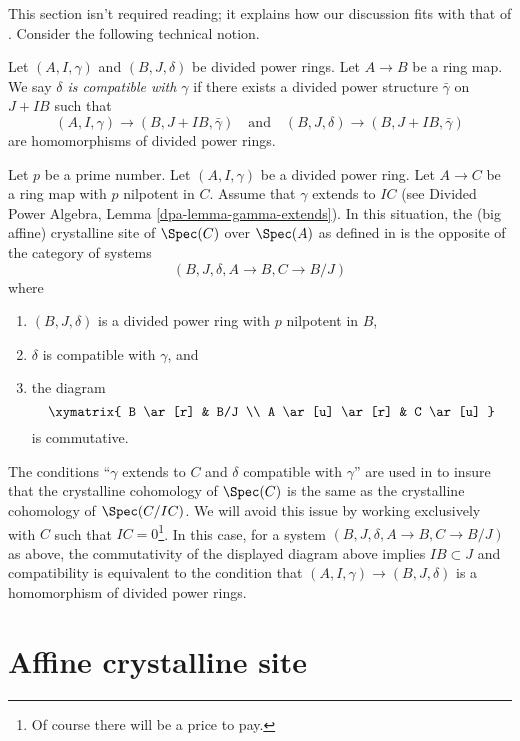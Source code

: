 \noindent
This section isn't required reading; it explains how our discussion
fits with that of \cite{Berthelot}.
Consider the following technical notion.

\begin{definition}
\label{definition-compatible}
Let $(A, I, \gamma)$ and $(B, J, \delta)$ be divided power rings.
Let $A \to B$ be a ring map. We say
{\it $\delta$ is compatible with $\gamma$}
if there exists a divided power structure $\bar\gamma$ on
$J + IB$ such that
$$
(A, I, \gamma) \to (B, J + IB, \bar \gamma)\quad\text{and}\quad
(B, J, \delta) \to (B, J + IB, \bar \gamma)
$$
are homomorphisms of divided power rings.
\end{definition}

\noindent
Let $p$ be a prime number. Let $(A, I, \gamma)$ be a divided power ring.
Let $A \to C$ be a ring map with $p$ nilpotent in $C$.
Assume that $\gamma$ extends to $IC$ (see
Divided Power Algebra, Lemma \ref{dpa-lemma-gamma-extends}).
In this situation, the (big affine) crystalline site of
$\Spec(C)$ over $\Spec(A)$
as defined in \cite{Berthelot} 
is the opposite of the category of systems
$$
(B, J, \delta, A \to B, C \to B/J)
$$
where
\begin{enumerate}
\item $(B, J, \delta)$ is a divided power ring with $p$ nilpotent in $B$,
\item $\delta$ is compatible with $\gamma$, and
\item the diagram
$$
\xymatrix{
B \ar[r] & B/J \\
A \ar[u] \ar[r] & C \ar[u]
}
$$
is commutative.
\end{enumerate}
The conditions
``$\gamma$ extends to $C$ and $\delta$ compatible with $\gamma$''
are used in \cite{Berthelot} to insure that
the crystalline cohomology of $\Spec(C)$ is the same as the crystalline
cohomology of $\Spec(C/IC)$. We will avoid this issue
by working exclusively with $C$ such that $IC = 0$\footnote{Of course there
will be a price to pay.}. In this case,
for a system $(B, J, \delta, A \to B, C \to B/J)$ as above,
the commutativity of the displayed diagram above implies $IB \subset J$ and
compatibility is equivalent to the condition that
$(A, I, \gamma) \to (B, J, \delta)$ is a homomorphism of divided
power rings.




\section{Affine crystalline site}
\label{section-affine-site}

